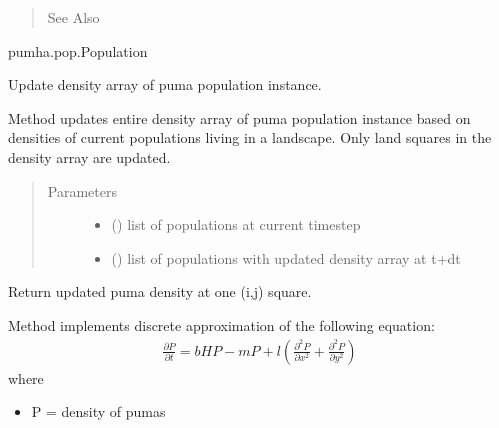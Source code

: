 \documentclass[letterpaper,10pt,english]{sphinxmanual}
\begin{document}
\begin{fulllineitems}
\begin{quote}
\begin{description}
\item[{See Also}] \leavevmode
\end{description}\end{quote}

pumha.pop.Population

\begin{fulllineitems}
\label{\detokenize{pumha:pumha.pop.PumaPopulation.update_density}}
Update density array of puma population instance.

Method updates entire density array of puma population instance based
on densities of current populations living in a landscape. Only land
squares in the density array are updated.
\begin{quote}\begin{description}
\item[{Parameters}] \leavevmode\begin{itemize}
\item {} 
 () \textendash{} list of populations at current timestep

\item {} 
 () \textendash{} list of populations with updated density array at t+dt

\end{itemize}

\end{description}\end{quote}

\end{fulllineitems}


\begin{fulllineitems}
\label{\detokenize{pumha:pumha.pop.PumaPopulation.update_density_ij}}
Return updated puma density at one (i,j) square.

Method implements discrete approximation of the following equation:
\begin{equation*}
\begin{split}\frac{\partial P}{\partial t} = bHP-mP+l(\frac{\partial^2 P}                     {\partial x^2} + \frac{\partial^2 P}{\partial y^2})\end{split}
\end{equation*}
where
\begin{itemize}
\item {} 
P = density of pumas


\end{itemize}
\end{fulllineitems}
\end{fulllineitems}
\end{document}
